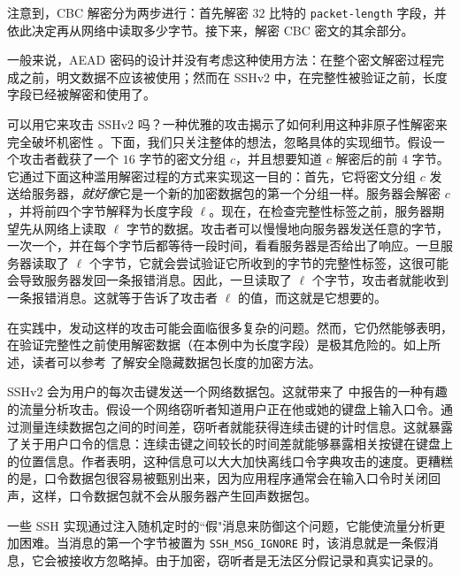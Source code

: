 \begin{snote}[针对非原子性解密的攻击。]
注意到，CBC 解密分为两步进行：首先解密 $32$ 比特的 \texttt{packet-length} 字段，并依此决定再从网络中读取多少字节。接下来，解密 CBC 密文的其余部分。

一般来说，AEAD 密码的设计并没有考虑这种使用方法：在整个密文解密过程完成之前，明文数据不应该被使用；然而在 SSHv2 中，在完整性被验证之前，长度字段已经被解密和使用了。

可以用它来攻击 SSHv2 吗？一种优雅的攻击揭示了如何利用这种非原子性解密来完全破坏机密性 \cite{albrecht2009plaintext}。下面，我们只关注整体的想法，忽略具体的实现细节。假设一个攻击者截获了一个 $16$ 字节的密文分组 $c$，并且想要知道 $c$ 解密后的前 $4$ 字节。它通过下面这种滥用解密过程的方式来实现这一目的：首先，它将密文分组 $c$ 发送给服务器，\emph{就好像}它是一个新的加密数据包的第一个分组一样。服务器会解密 $c$，并将前四个字节解释为长度字段 $\ell$。现在，在检查完整性标签之前，服务器期望先从网络上读取 $\ell$ 字节的数据。攻击者可以慢慢地向服务器发送任意的字节，一次一个，并在每个字节后都等待一段时间，看看服务器是否给出了响应。一旦服务器读取了 $\ell$ 个字节，它就会尝试验证它所收到的字节的完整性标签，这很可能会导致服务器发回一条报错消息。因此，一旦读取了 $\ell$ 个字节，攻击者就能收到一条报错消息。这就等于告诉了攻击者 $\ell$ 的值，而这就是它想要的。

在实践中，发动这样的攻击可能会面临很多复杂的问题。然而，它仍然能够表明，在验证完整性之前使用解密数据（在本例中为长度字段）是极其危险的。如上所述，读者可以参考 \cite{boldyreva2012security} 了解安全隐藏数据包长度的加密方法。
\end{snote}

\begin{snote}
SSHv2 会为用户的每次击键发送一个网络数据包。这就带来了 \cite{song2001timing} 中报告的一种有趣的流量分析攻击。假设一个网络窃听者知道用户正在他或她的键盘上输入口令。通过测量连续数据包之间的时间差，窃听者就能获得连续击键的计时信息。这就暴露了关于用户口令的信息：连续击键之间较长的时间差就能够暴露相关按键在键盘上的位置信息。作者表明，这种信息可以大大加快离线口令字典攻击的速度。更糟糕的是，口令数据包很容易被甄别出来，因为应用程序通常会在输入口令时关闭回声，这样，口令数据包就不会从服务器产生回声数据包。

一些 SSH 实现通过注入随机定时的``假"消息来防御这个问题，它能使流量分析更加困难。当消息的第一个字节被置为 \texttt{SSH\_MSG\_IGNORE} 时，该消息就是一条假消息，它会被接收方忽略掉。由于加密，窃听者是无法区分假记录和真实记录的。
\end{snote}